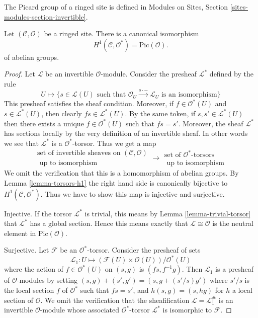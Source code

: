 \noindent
The Picard group of a ringed site is defined in
Modules on Sites, Section \ref{sites-modules-section-invertible}.

\begin{lemma}
\label{lemma-h1-invertible}
Let $(\mathcal{C}, \mathcal{O})$ be a ringed site.
There is a canonical isomorphism
$$
H^1(\mathcal{C}, \mathcal{O}^*) = \text{Pic}(\mathcal{O}).
$$
of abelian groups.
\end{lemma}

\begin{proof}
Let $\mathcal{L}$ be an invertible $\mathcal{O}$-module.
Consider the presheaf $\mathcal{L}^*$ defined by the rule
$$
U \longmapsto \{s \in \mathcal{L}(U)
\text{ such that } \mathcal{O}_U \xrightarrow{s \cdot -} \mathcal{L}_U
\text{ is an isomorphism}\}
$$
This presheaf satisfies the sheaf condition. Moreover, if
$f \in \mathcal{O}^*(U)$ and $s \in \mathcal{L}^*(U)$, then clearly
$fs \in \mathcal{L}^*(U)$. By the same token, if $s, s' \in \mathcal{L}^*(U)$
then there exists a unique $f \in \mathcal{O}^*(U)$ such that
$fs = s'$. Moreover, the sheaf $\mathcal{L}^*$ has sections locally
by the very definition of an invertible sheaf. In other words we
see that $\mathcal{L}^*$ is a $\mathcal{O}^*$-torsor. Thus we get
a map
$$
\begin{matrix}
\text{set of invertible sheaves on }(\mathcal{C}, \mathcal{O}) \\
\text{ up to isomorphism}
\end{matrix}
\longrightarrow
\begin{matrix}
\text{set of }\mathcal{O}^*\text{-torsors} \\
\text{ up to isomorphism}
\end{matrix}
$$
We omit the verification that this is a homomorphism of abelian groups.
By
Lemma \ref{lemma-torsors-h1}
the right hand side is canonically
bijective to $H^1(\mathcal{C}, \mathcal{O}^*)$.
Thus we have to show this map is injective and surjective.

\medskip\noindent
Injective. If the torsor $\mathcal{L}^*$ is trivial, this means by
Lemma \ref{lemma-trivial-torsor}
that $\mathcal{L}^*$ has a global section.
Hence this means exactly that $\mathcal{L} \cong \mathcal{O}$ is
the neutral element in $\text{Pic}(\mathcal{O})$.

\medskip\noindent
Surjective. Let $\mathcal{F}$ be an $\mathcal{O}^*$-torsor.
Consider the presheaf of sets
$$
\mathcal{L}_1 : U \longmapsto
(\mathcal{F}(U) \times \mathcal{O}(U))/\mathcal{O}^*(U)
$$
where the action of $f \in \mathcal{O}^*(U)$ on
$(s, g)$ is $(fs, f^{-1}g)$. Then $\mathcal{L}_1$ is a presheaf
of $\mathcal{O}$-modules by setting
$(s, g) + (s', g') = (s, g + (s'/s)g')$ where $s'/s$ is the local
section $f$ of $\mathcal{O}^*$ such that $fs = s'$, and
$h(s, g) = (s, hg)$ for $h$ a local section of $\mathcal{O}$.
We omit the verification that the sheafification
$\mathcal{L} = \mathcal{L}_1^\#$ is an invertible $\mathcal{O}$-module
whose associated $\mathcal{O}^*$-torsor $\mathcal{L}^*$ is isomorphic
to $\mathcal{F}$.
\end{proof}









